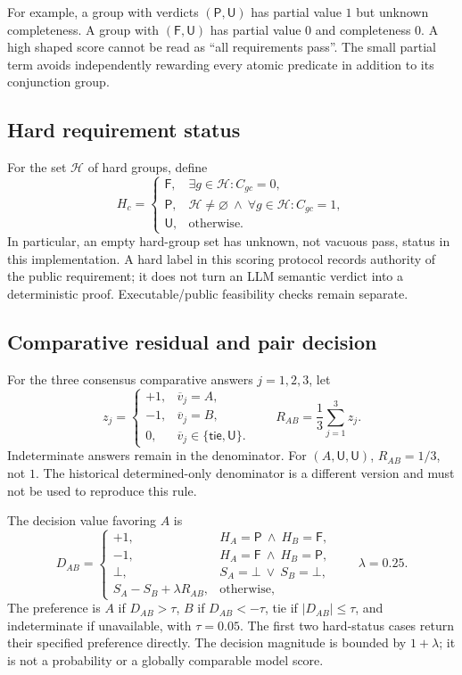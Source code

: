 \documentclass[11pt]{article}
\newcommand{\unknown}{\bot}
\newcommand{\PASS}{\mathsf{P}}
\newcommand{\FAIL}{\mathsf{F}}
\newcommand{\UNK}{\mathsf{U}}
\begin{document}
For example, a group with verdicts $(\PASS,\UNK)$ has partial value $1$ but
unknown completeness. A group with $(\FAIL,\UNK)$ has partial value $0$ and
completeness $0$. A high shaped score cannot be read as ``all requirements pass''.
The small partial term avoids independently rewarding every atomic predicate
in addition to its conjunction group.

\subsection{Hard requirement status}
For the set $\mathcal H$ of hard groups, define
\begin{equation}
 H_c=\begin{cases}
 \FAIL,&\exists g\in\mathcal H:C_{gc}=0,\\
 \PASS,&\mathcal H\ne\varnothing\ \land\ \forall g\in\mathcal H:C_{gc}=1,\\
 \UNK,&\text{otherwise}.
 \end{cases}
 \label{eq:hard}
\end{equation}
In particular, an empty hard-group set has unknown, not vacuous pass, status in
this implementation. A hard label in this scoring protocol records authority of
the public requirement; it does not turn an LLM semantic verdict into a
deterministic proof. Executable/public feasibility checks remain separate.

\subsection{Comparative residual and pair decision}
For the three consensus comparative answers $j=1,2,3$, let
\begin{equation}
 z_j=\begin{cases}
 +1,&\overline v_j=A,\\
 -1,&\overline v_j=B,\\
 0,&\overline v_j\in\{\mathsf{tie},\UNK\}.
 \end{cases}
 \qquad R_{AB}=\frac13\sum_{j=1}^{3}z_j.
 \label{eq:comparative}
\end{equation}
Indeterminate answers remain in the denominator. For $(A,\UNK,\UNK)$,
$R_{AB}=1/3$, not $1$. The historical determined-only denominator is a different
version and must not be used to reproduce this rule.

The decision value favoring $A$ is
\begin{equation}
 D_{AB}=\begin{cases}
 +1,&H_A=\PASS\ \land\ H_B=\FAIL,\\
 -1,&H_A=\FAIL\ \land\ H_B=\PASS,\\
 \unknown,&S_A=\unknown\ \lor\ S_B=\unknown,\\
 S_A-S_B+\lambda R_{AB},&\text{otherwise},
 \end{cases}\qquad \lambda=0.25.
 \label{eq:judge-decision}
\end{equation}
The preference is $A$ if $D_{AB}>\tau$, $B$ if $D_{AB}<-\tau$, tie if
$|D_{AB}|\leq\tau$, and indeterminate if unavailable, with $\tau=0.05$.
The first two hard-status cases return their specified preference directly.
The decision magnitude is bounded by $1+\lambda$; it is not a probability or a
globally comparable model score.
\end{document}
